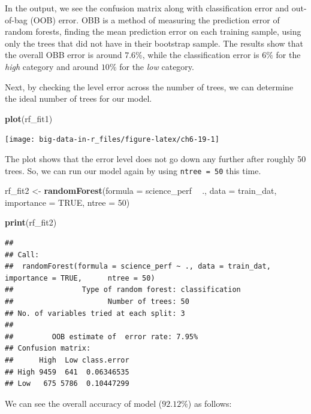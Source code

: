 \documentclass[]{book}
\newenvironment{Shaded}{\begin{snugshade}}{\end{snugshade}}
\newcommand{\DataTypeTok}[1]{\textcolor[rgb]{0.13,0.29,0.53}{#1}}
\newcommand{\DecValTok}[1]{\textcolor[rgb]{0.00,0.00,0.81}{#1}}
\newcommand{\KeywordTok}[1]{\textcolor[rgb]{0.13,0.29,0.53}{\textbf{#1}}}
\newcommand{\NormalTok}[1]{#1}
\newcommand{\OperatorTok}[1]{\textcolor[rgb]{0.81,0.36,0.00}{\textbf{#1}}}
\newcommand{\OtherTok}[1]{\textcolor[rgb]{0.56,0.35,0.01}{#1}}
\newcommand{\StringTok}[1]{\textcolor[rgb]{0.31,0.60,0.02}{#1}}
\begin{document}
In the output, we see the confusion matrix along with classification error and out-of-bag (OOB) error. OBB is a method of measuring the prediction error of random forests, finding the mean prediction error on each training sample, using only the trees that did not have in their bootstrap sample. The results show that the overall OBB error is around \(7.6\%\), while the classification error is \(6\%\) for the \emph{high} category and around \(10\%\) for the \emph{low} category.

Next, by checking the level error across the number of trees, we can determine the ideal number of trees for our model.

\begin{Shaded}
\begin{Highlighting}[]
\KeywordTok{plot}\NormalTok{(rf_fit1)}
\end{Highlighting}
\end{Shaded}

\texttt{[image: big-data-in-r\_files/figure-latex/ch6-19-1]}

The plot shows that the error level does not go down any further after roughly 50 trees. So, we can run our model again by using \texttt{ntree\ =\ 50} this time.

\begin{Shaded}
\begin{Highlighting}[]
\NormalTok{rf_fit2 <-}\StringTok{ }\KeywordTok{randomForest}\NormalTok{(}\DataTypeTok{formula =}\NormalTok{ science_perf }\OperatorTok{~}\StringTok{ }\NormalTok{.,}
                        \DataTypeTok{data =}\NormalTok{ train_dat,}
                        \DataTypeTok{importance =} \OtherTok{TRUE}\NormalTok{, }\DataTypeTok{ntree =} \DecValTok{50}\NormalTok{)}

\KeywordTok{print}\NormalTok{(rf_fit2)}
\end{Highlighting}
\end{Shaded}

\begin{verbatim}
## 
## Call:
##  randomForest(formula = science_perf ~ ., data = train_dat, importance = TRUE,      ntree = 50) 
##                Type of random forest: classification
##                      Number of trees: 50
## No. of variables tried at each split: 3
## 
##         OOB estimate of  error rate: 7.95%
## Confusion matrix:
##      High  Low class.error
## High 9459  641  0.06346535
## Low   675 5786  0.10447299
\end{verbatim}

We can see the overall accuracy of model (\(92.12\%\)) as follows:
\end{document}
